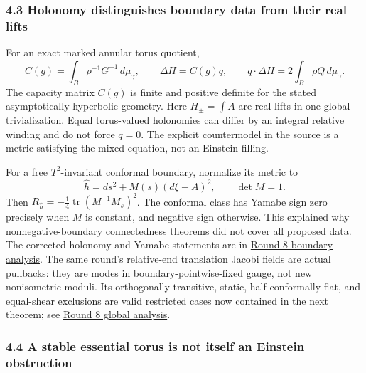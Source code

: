 \documentclass[
  english,
]{article}
\begin{document}
\hypertarget{holonomy-distinguishes-boundary-data-from-their-real-lifts}{%
\subsubsection{4.3 Holonomy distinguishes boundary data from their real
lifts}\label{holonomy-distinguishes-boundary-data-from-their-real-lifts}}

For an exact marked annular torus quotient, \[
 C(g)=\int_B\rho^{-1}G^{-1}\,d\mu_\gamma,\qquad
 \Delta H=C(g)q,\qquad
 q\cdot\Delta H=2\int_B\rho Q\,d\mu_\gamma.
\] The capacity matrix \(C(g)\) is finite and positive definite for the
stated asymptotically hyperbolic geometry. Here \(H_\pm=\int A\) are
real lifts in one global trivialization. Equal torus-valued holonomies
can differ by an integral relative winding and do not force \(q=0\). The
explicit countermodel in the source is a metric satisfying the mixed
equation, not an Einstein filling.

For a free \(T^2\)-invariant conformal boundary, normalize its metric to
\[
 \widehat h=ds^2+M(s)(d\xi+A)^2,\qquad \det M=1.
\] Then \(R_{\widehat h}=-\frac14\operatorname{tr}(M^{-1}M_s)^2\). The
conformal class has Yamabe sign zero precisely when \(M\) is constant,
and negative sign otherwise. This explained why nonnegative-boundary
connectedness theorems did not cover all proposed data. The corrected
holonomy and Yamabe statements are in
\href{../proofs/round8_boundary.md}{Round 8 boundary analysis}. The same
round's relative-end translation Jacobi fields are actual pullbacks:
they are modes in boundary-pointwise-fixed gauge, not new nonisometric
moduli. Its orthogonally transitive, static, half-conformally-flat, and
equal-shear exclusions are valid restricted cases now contained in the
next theorem; see \href{../proofs/round8_global.md}{Round 8 global
analysis}.

\hypertarget{a-stable-essential-torus-is-not-itself-an-einstein-obstruction}{%
\subsubsection{4.4 A stable essential torus is not itself an Einstein
obstruction}\label{a-stable-essential-torus-is-not-itself-an-einstein-obstruction}}
\end{document}
